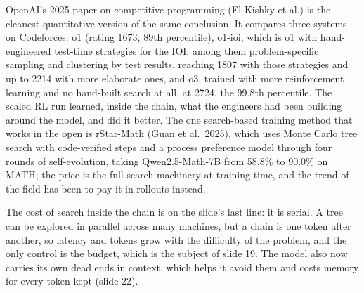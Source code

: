 \documentclass[11pt,letterpaper]{article}
\begin{document}
OpenAI's 2025 paper on competitive programming (El-Kishky et al.) is the cleanest quantitative version of the same conclusion. It compares three systems on Codeforces: o1 (rating 1673, 89th percentile), o1-ioi, which is o1 with hand-engineered test-time strategies for the IOI, among them problem-specific sampling and clustering by test results, reaching 1807 with those strategies and up to 2214 with more elaborate ones, and o3, trained with more reinforcement learning and no hand-built search at all, at 2724, the 99.8th percentile. The scaled RL run learned, inside the chain, what the engineers had been building around the model, and did it better. The one search-based training method that works in the open is rStar-Math (Guan et al.\ 2025), which uses Monte Carlo tree search with code-verified steps and a process preference model through four rounds of self-evolution, taking Qwen2.5-Math-7B from 58.8\% to 90.0\% on MATH; the price is the full search machinery at training time, and the trend of the field has been to pay it in rollouts instead.

The cost of search inside the chain is on the slide's last line: it is serial. A tree can be explored in parallel across many machines, but a chain is one token after another, so latency and tokens grow with the difficulty of the problem, and the only control is the budget, which is the subject of slide 19. The model also now carries its own dead ends in context, which helps it avoid them and costs memory for every token kept (slide 22).
\end{document}
